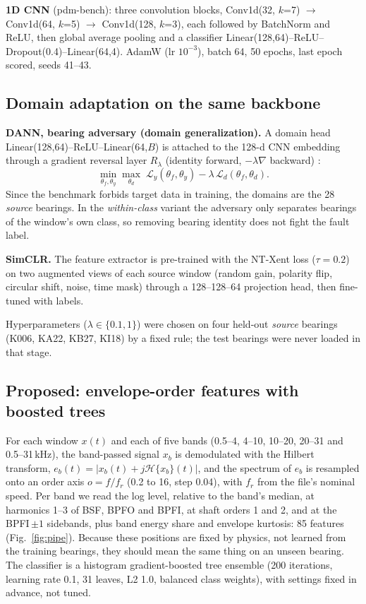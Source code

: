 \documentclass[conference]{IEEEtran}
\begin{document}
\textbf{1D CNN} (pdm-bench): three convolution blocks, Conv1d(32, $k$=7) $\rightarrow$
Conv1d(64, $k$=5) $\rightarrow$ Conv1d(128, $k$=3), each followed by BatchNorm and ReLU, then
global average pooling and a classifier Linear(128,64)--ReLU--Dropout(0.4)--Linear(64,4).
AdamW (lr $10^{-3}$), batch 64, 50 epochs, last epoch scored, seeds 41--43.

\subsection{Domain adaptation on the same backbone}
\textbf{DANN, bearing adversary (domain generalization).} A domain head
Linear(128,64)--ReLU--Linear(64,$B$) is attached to the 128-d CNN embedding through a gradient
reversal layer $R_\lambda$ (identity forward, $-\lambda\nabla$ backward) \cite{ganin2015}:
\begin{equation}
\min_{\theta_f,\theta_y}\max_{\theta_d}\;
\mathcal{L}_y(\theta_f,\theta_y)-\lambda\,\mathcal{L}_d(\theta_f,\theta_d).
\end{equation}
Since the benchmark forbids target data in training, the domains are the 28 \emph{source}
bearings. In the \emph{within-class} variant the adversary only separates bearings of the
window's own class, so removing bearing identity does not fight the fault label.

\textbf{SimCLR.} The feature extractor is pre-trained with the NT-Xent loss ($\tau=0.2$) on two
augmented views of each source window (random gain, polarity flip, circular shift, noise, time
mask) through a 128--128--64 projection head, then fine-tuned with labels.

Hyperparameters ($\lambda\in\{0.1,1\}$) were chosen on four held-out \emph{source} bearings
(K006, KA22, KB27, KI18) by a fixed rule; the test bearings were never loaded in that stage.

\subsection{Proposed: envelope-order features with boosted trees}
For each window $x(t)$ and each of five bands (0.5--4, 4--10, 10--20, 20--31 and 0.5--31\,kHz),
the band-passed signal $x_b$ is demodulated with the Hilbert transform,
$e_b(t)=|x_b(t)+j\mathcal{H}\{x_b\}(t)|$, and the spectrum of $e_b$ is resampled onto an order
axis $o=f/f_r$ (0.2 to 16, step 0.04), with $f_r$ from the file's nominal speed. Per band we read
the log level, relative to the band's median, at harmonics 1--3 of BSF, BPFO and BPFI, at shaft
orders 1 and 2, and at the BPFI\,$\pm1$ sidebands, plus band energy share and envelope kurtosis:
85 features (Fig.~\ref{fig:pipe}). Because these positions are fixed by physics, not learned
from the training bearings, they should mean the same thing on an unseen bearing. The classifier
is a histogram gradient-boosted tree ensemble (200 iterations, learning rate 0.1, 31 leaves, L2
1.0, balanced class weights), with settings fixed in advance, not tuned.
\end{document}
